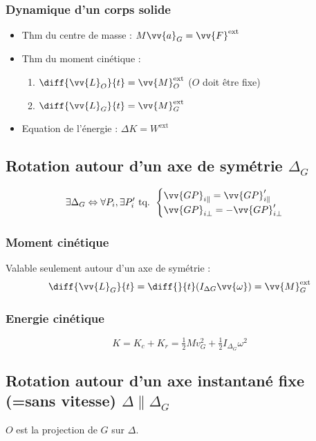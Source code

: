 \documentclass[landscape,a4paper]{article}
\newcommand{\F}{\ensuremath{\vv{F}}}
\newcommand{\vian}{\ensuremath{\vv{\omega}}}
\newcommand{\ac}{\ensuremath{\vv{a}}}
\newcommand{\mc}{\ensuremath{\vv{L}}}
\newcommand{\mf}{\ensuremath{\vv{M}}}
\newcommand{\exte}{\text{ext}}
\begin{document}
\begin{multicols}{4}
  \subsubsection{Dynamique d'un corps solide}
  \begin{itemize}
    \item Thm du centre de masse : \( M\ac_G = \F^{\exte} \)
    \item Thm du moment cinétique : 
      \begin{enumerate}
        \item \(\diff{\mc_O}{t} = \mf_O^{\exte}\) (\(O\) doit être fixe)
        \item \(\diff{\mc_G}{t} = \mf_G^{\exte}\)
      \end{enumerate} 
    \item Equation de l'énergie : \(\Delta K = W^{\exte}\)
  \end{itemize}

  \subsection{Rotation autour d'un axe de symétrie \(\Delta_G\)}
  \[
    \exists \Delta_G \Leftrightarrow \forall P_i, \exists P_i' \text{ tq. } 
    \begin{cases}
      \vv{GP}_{i\parallel}=\vv{GP}_{i\parallel}'\\
      \vv{GP}_{i\bot}=-\vv{GP}_{i\bot}'\\
    \end{cases}
  \]

  \subsubsection{Moment cinétique}
  Valable seulement autour d'un axe de symétrie : 
  \[
    \diff{\mc_G}{t} = \diff{}{t}(I_{\Delta G}\vian)=\mf^{\exte}_G
  \]
  \subsubsection{Energie cinétique}
  \[
    K = K_c + K_r = \tfrac{1}{2}Mv_G^2 + \tfrac{1}{2}I_{\Delta_G}\omega^2
  \]

  \subsection{Rotation autour d'un axe instantané fixe (=sans vitesse) \(\Delta \parallel \Delta_G\)}
  \(O\) est la projection de \(G\) sur \(\Delta\).


\end{multicols}
\end{document}
